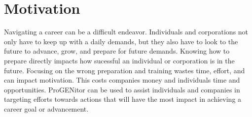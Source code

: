 \section{Motivation}
\label{sect:motivation}
Navigating a career can be a difficult endeavor.  Individuals and corporations
not only have to keep up with a daily demands, but they also have to look to the
future to advance, grow, and prepare for future demands.  Knowing how to prepare
directly impacts how sucessful an individual or corporation is in the future. 
Focusing on the wrong preparation and training wastes time, effort, and can
impact motivation.  This costs companies money and individuals time and
opportunities.  ProGENitor can be used to assist individuals and companies in
targeting efforts towards actions that will have the most impact in achieving a
career goal or advancement.
